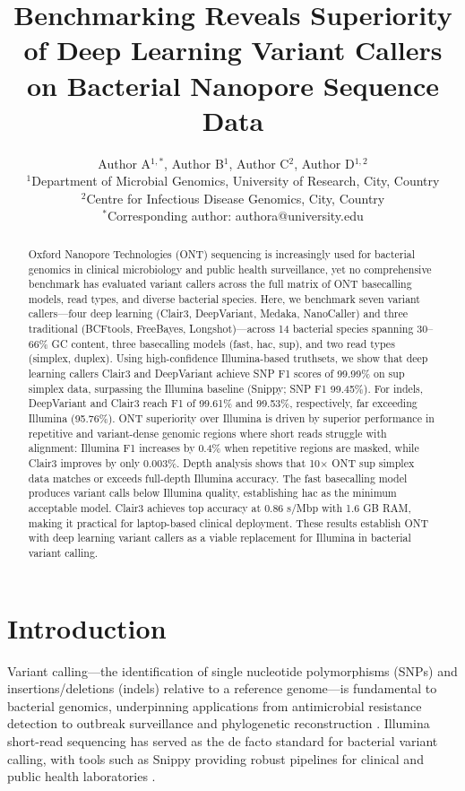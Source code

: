 \documentclass[11pt]{article}
\title{Benchmarking Reveals Superiority of Deep Learning Variant Callers on Bacterial Nanopore Sequence Data}
\author{%
  Author A$^{1,*}$, Author B$^{1}$, Author C$^{2}$, Author D$^{1,2}$ \\[6pt]
  $^{1}$Department of Microbial Genomics, University of Research, City, Country \\
  $^{2}$Centre for Infectious Disease Genomics, City, Country \\
  $^{*}$Corresponding author: authora@university.edu
}
\date{}
\begin{document}
\maketitle

\begin{abstract}
Oxford Nanopore Technologies (ONT) sequencing is increasingly used for bacterial genomics in clinical microbiology and public health surveillance, yet no comprehensive benchmark has evaluated variant callers across the full matrix of ONT basecalling models, read types, and diverse bacterial species. Here, we benchmark seven variant callers---four deep learning (Clair3, DeepVariant, Medaka, NanoCaller) and three traditional (BCFtools, FreeBayes, Longshot)---across 14 bacterial species spanning 30--66\% GC content, three basecalling models (fast, hac, sup), and two read types (simplex, duplex). Using high-confidence Illumina-based truthsets, we show that deep learning callers Clair3 and DeepVariant achieve SNP F1 scores of 99.99\% on sup simplex data, surpassing the Illumina baseline (Snippy; SNP F1 99.45\%). For indels, DeepVariant and Clair3 reach F1 of 99.61\% and 99.53\%, respectively, far exceeding Illumina (95.76\%). ONT superiority over Illumina is driven by superior performance in repetitive and variant-dense genomic regions where short reads struggle with alignment: Illumina F1 increases by 0.4\% when repetitive regions are masked, while Clair3 improves by only 0.003\%. Depth analysis shows that 10$\times$ ONT sup simplex data matches or exceeds full-depth Illumina accuracy. The fast basecalling model produces variant calls below Illumina quality, establishing hac as the minimum acceptable model. Clair3 achieves top accuracy at 0.86 s/Mbp with 1.6 GB RAM, making it practical for laptop-based clinical deployment. These results establish ONT with deep learning variant callers as a viable replacement for Illumina in bacterial variant calling.
\end{abstract}

\section{Introduction}

Variant calling---the identification of single nucleotide polymorphisms (SNPs) and insertions/deletions (indels) relative to a reference genome---is fundamental to bacterial genomics, underpinning applications from antimicrobial resistance detection to outbreak surveillance and phylogenetic reconstruction \citep{didelot2012,croucher2013,kwong2015}. Illumina short-read sequencing has served as the de facto standard for bacterial variant calling, with tools such as Snippy providing robust pipelines for clinical and public health laboratories \citep{seemann2015}.
\end{document}
